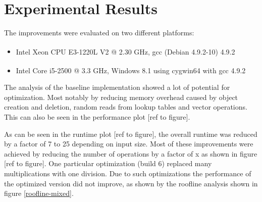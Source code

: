 \section{Experimental Results}\label{sec:results}

 The improvements were evaluated on two different platforms:
\begin{itemize}
\item Intel\textsuperscript{\textregistered} Xeon CPU E3-1220L V2 @ 2.30 GHz, gcc (Debian 4.9.2-10) 4.9.2
\item Intel\textsuperscript{\textregistered} Core i5-2500 @ 3.3 GHz, Windows 8.1 using cygwin64 with gcc 4.9.2
\end{itemize}

The analysis of the baseline implementation showed a lot of potential for optimization. Most notably by reducing memory overhead caused by object creation and deletion, random reads from lookup tables and vector operations. This can also be seen in the performance plot [ref to figure].

As can be seen in the runtime plot [ref to figure], the overall runtime was reduced by a factor of 7 to 25 depending on input size. Most of these improvements were achieved by reducing the number of operations by a factor of x as shown in figure [ref to figure]. One particular optimization (build 6) replaced many multiplications with one division. Due to such optimizations the performance of the optimized version did not improve, as shown by the roofline analysis \cite{Ofenbeck:14} shown in figure \ref{roofline-mixed}.

